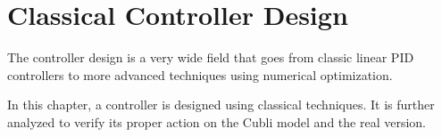 \chapter{Classical Controller Design}\label{chap:controllerDesign}
The controller design is a very wide field that goes from classic linear PID controllers to more advanced techniques using numerical optimization.

In this chapter, a controller is designed using classical techniques. It is further analyzed to verify its proper action on the Cubli model and the real version.